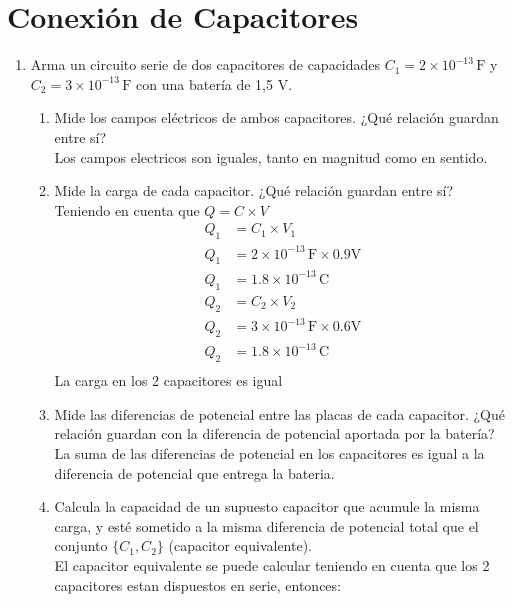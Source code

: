 \documentclass[12pt]{report}
\begin{document}
\newpage

\section{Conexión de Capacitores}

\begin{enumerate}
    \item Arma un circuito serie de dos capacitores de capacidades $C_1 = 2 \times 10^{-13} \, \text{F}$ y $C_2 = 3 \times 10^{-13} \, \text{F}$ con una batería de 1,5 V.
    \begin{enumerate}
        \item Mide los campos eléctricos de ambos capacitores. ¿Qué relación guardan entre sí?\\[6pt]
            Los campos electricos son iguales, tanto en magnitud como en sentido.\\
        \item Mide la carga de cada capacitor. ¿Qué relación guardan entre sí?\\[6pt]
            Teniendo en cuenta que $Q=C \times V$ 
            \begin{align*}
            Q_1&= C_1 \times V_1\\[6pt]
            Q_1&= 2 \times 10^{-13} \,\text{F} \times 0.9 \text{V}\\[6pt]
            Q_1&= 1.8\times 10^{-13} \,\text{C}
            \end{align*}
            \begin{align*}
            Q_2&= C_2 \times V_2\\[6pt]
            Q_2&= 3 \times 10^{-13} \,\text{F} \times 0.6 \text{V}\\[6pt]
            Q_2&= 1.8\times 10^{-13} \,\text{C}\\[12pt]
            \end{align*}
            La carga en los 2 capacitores es igual\\

        \item Mide las diferencias de potencial entre las placas de cada capacitor. ¿Qué relación guardan con la diferencia de potencial aportada por la batería?\\[6pt]
            La suma de las diferencias de potencial en los capacitores es igual a la diferencia de potencial que entrega la bateria.\\

\newpage

        \item Calcula la capacidad de un supuesto capacitor que acumule la misma carga, y esté sometido a la misma diferencia de potencial total que el conjunto $\{C_1, C_2\}$ (capacitor equivalente).\\[6pt]
            El capacitor equivalente se puede calcular teniendo en cuenta que los 2 capacitores estan dispuestos en serie, entonces:\\


\end{enumerate}
\end{enumerate}
\end{document}
